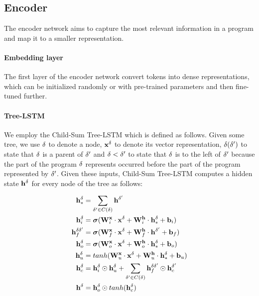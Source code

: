 \subsection{Encoder}
\label{sec:encoder}
The encoder network aims to capture the most relevant information in a program and map it to a smaller representation. 

\paragraph{Embedding layer} The first layer of the encoder network convert tokens into dense representations, which can be initialized randomly or with pre-trained parameters and then fine-tuned further.


\paragraph{Tree-LSTM} We employ the Child-Sum Tree-LSTM \cite{tai2015improved} which is defined as follows. Given some tree, we use $\delta$ to denote a node, $\mathbf{x}^\delta$ to denote its vector representation, $\delta(\delta')$ to state that $\delta$ is a parent of $\delta'$ and $\delta < \delta'$ to state that $\delta$ is to the left of $\delta'$ because the part of the program $\delta$ represents occurred before the part of the program represented by $\delta'$.
Given these inputs, Child-Sum Tree-LSTM computes a hidden state $\mathbf{h}^\delta$ for every node of the tree as follows:

\begin{align}\label{eq:tree_lstm_encoder}
    \mathbf{h}^\delta_{*} &= \sum_{\delta' \in C(\delta)} \mathbf{h}^{\delta'} \\
    \mathbf{h}_i^\delta &= \boldsymbol\sigma(\mathbf{W}^{\mathbf{x}}_{i} \cdot \mathbf{x}^\delta + \mathbf{W}^{\mathbf{h}}_{i} \cdot \mathbf{h}^\delta_* + \mathbf{b}_{i})  \\ 
    \mathbf{h}_f^{\delta \delta'} &= \boldsymbol\sigma(\mathbf{W}^{\mathbf{x}}_{f} \cdot \mathbf{x}^\delta + \mathbf{W}^{\mathbf{h}}_{f} \cdot \mathbf{h}^{\delta'} + \mathbf{b}_{f}) \\\label{eq:child_sum_4}
    \mathbf{h}_o^\delta &= \boldsymbol\sigma(\mathbf{W}^{\mathbf{x}}_{o} \cdot \mathbf{x}^\delta + \mathbf{W}^{\mathbf{h}}_{o} \cdot \mathbf{h}^\delta_* + \mathbf{b}_{o}) \\
    \mathbf{h}_u^\delta &= tanh(\mathbf{W}^{\mathbf{x}}_{u} \cdot \mathbf{x}^\delta + \mathbf{W}^{\mathbf{h}}_{u} \cdot \mathbf{h}^\delta_* + \mathbf{b}_{u}) \\
    \mathbf{h}_c^\delta &= \mathbf{h}_i^\delta \odot \mathbf{h}_u^\delta + \sum_{\delta' \in C(\delta)} \mathbf{h}_f^{\delta \delta'} \odot \mathbf{h}_c^{\delta'} \\
    \mathbf{h}^\delta &= \mathbf{h}_o^\delta \odot tanh(\mathbf{h}_c^\delta)
\end{align}

